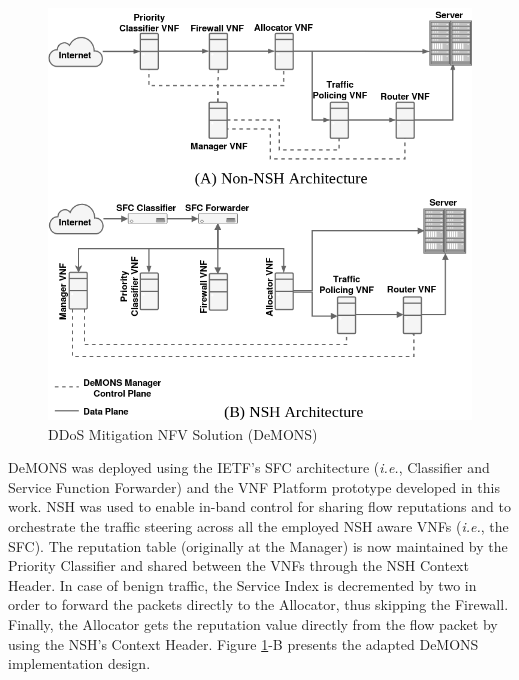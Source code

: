 \begin{figure}[!h]
\centering
\includegraphics[width=.8\textwidth]{images/DeMONS2.png}
\caption{DDoS Mitigation NFV Solution (DeMONS)}
\label{FIG:DeMONS}
\end{figure}


DeMONS was deployed using the IETF's SFC architecture (\textit{i.e.}, Classifier and Service Function Forwarder) \cite{Joel-2015} and the VNF Platform prototype developed in this work. NSH was used to enable in-band control for sharing flow reputations and to orchestrate the traffic steering across all the employed NSH aware VNFs (\textit{i.e.}, the SFC). The reputation table (originally at the Manager) is now maintained by the Priority Classifier and shared between the VNFs through the NSH Context Header. In case of benign traffic, the Service Index is decremented by two in order to forward the packets directly to the Allocator, thus skipping the Firewall. Finally, the Allocator gets the reputation value directly from the flow packet by using the NSH's Context Header. Figure \ref{FIG:DeMONS}-B presents the adapted DeMONS implementation design.

